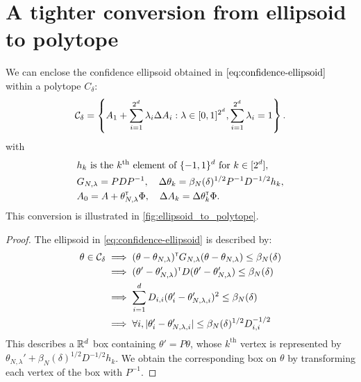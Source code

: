 \documentclass{article}
\begin{document}
\section{A tighter conversion from ellipsoid to polytope}
\label{sec:tight-polytope}
\begin{lemma}
	\label{lem:tight_polytope}
	We can enclose the confidence ellipsoid obtained in $\eqref{eq:confidence-ellipsoid}$ within a polytope $C_\delta$:
	\begin{equation}
	\mathcal{C}_\delta = \left\{ A_{1}+\sum_{i=1}^{2^d}\lambda_{i}\Delta A_{i}: \lambda\in[0, 1]^{2^d},  \sum_{i=1}^{2^d}\lambda_{i}=1\right\}.
	\end{equation}
	with 
	\begin{align*}
	&h_k \text{ is the }k^\text{th}\text{ element of }\{-1,1\}^d\text{ for } k\in[2^d],\\
	&G_{N,\lambda} = PDP^{-1}, \quad \Delta\theta_k = \beta_{N}(\delta)^{1/2} P^{-1}D^{-1/2} h_k, \\
	&A_0 = A + \theta_{N,\lambda}^{\mathsf{\scriptscriptstyle T}}\Phi, \quad \Delta A_k = \Delta\theta_k^{\mathsf{\scriptscriptstyle T}}\Phi.
	\end{align*}
	This conversion is illustrated in \autoref{fig:ellipsoid_to_polytope}.
\end{lemma}

\begin{proof}
	The ellipsoid in \eqref{eq:confidence-ellipsoid} is described by:
	\begin{align*}
	\theta\in\mathcal{C}_\delta &\implies
	(\theta-\theta_{N,\lambda})^{\mathsf{\scriptscriptstyle T}} G_{N,\lambda}(\theta-\theta_{N,\lambda}) \leq \beta_{N}(\delta)\\
	&\implies (\theta'-\theta'_{N,\lambda})^{\mathsf{\scriptscriptstyle T}} D (\theta'-\theta'_{N,\lambda}) \leq \beta_{N}(\delta)\\
	&\implies \sum_{i=1}^d D_{i,i}(\theta'_i-\theta'_{N,\lambda,i})^2\leq \beta_{N}(\delta)\\
	&\implies\forall i, |\theta'_i-\theta'_{N,\lambda,i}|\leq \beta_{N}(\delta)^{1/2}D_{i,i}^{-1/2}
	\end{align*}
	This describes a $\mathbb{R}^d$ box containing $\theta' = P\theta$, whose $k^\text{th}$ vertex is represented by $\theta_{N,\lambda}' + \beta_{N}(\delta)^{1/2}D^{-1/2} h_k$. We obtain the corresponding box on $\theta$ by transforming each vertex of the box with $P^{-1}$.
\end{proof}
\end{document}
